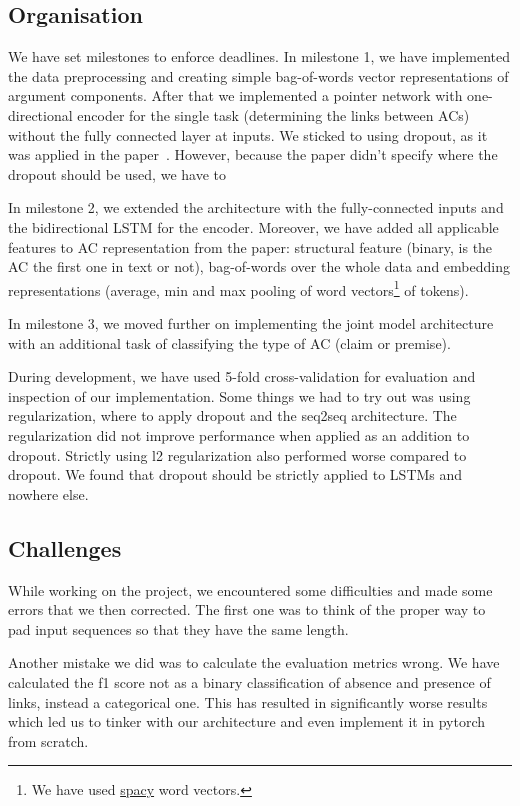 \documentclass[onecolumn]{article}
\begin{document}
\subsection{Organisation}
We have set milestones to enforce deadlines.
In milestone 1, we have implemented the data preprocessing and creating simple bag-of-words vector representations of argument components.
After that we implemented a pointer network with one-directional encoder for the single task (determining the links between ACs) without the fully connected layer at inputs.
We sticked to using dropout, as it was applied in the paper~\cite{potash2017here}.
However, because the paper didn't specify where the dropout should be used, we have to 

In milestone 2, we extended the architecture with the fully-connected inputs and the bidirectional LSTM for the encoder.
Moreover, we have added all applicable features to AC representation from the paper: structural feature
(binary, is the AC the first one in text or not), bag-of-words over the whole data and embedding representations (average, min and max pooling
of word vectors\footnote{We have used \href{https://github.com/explosion/spacy-models/releases/tag/en_vectors_web_lg-2.0.0}{spacy} word vectors.} of tokens).

In milestone 3, we moved further on implementing the joint model architecture with an additional task of classifying the type of AC (claim or premise).

During development, we have used 5-fold cross-validation for evaluation and inspection of our implementation.
Some things we had to try out was using regularization, where to apply dropout and the seq2seq architecture.
The regularization did not improve performance when applied as an addition to dropout.
Strictly using l2 regularization also performed worse compared to dropout.
We found that dropout should be strictly applied to LSTMs and nowhere else.

\subsection{Challenges}
While working on the project, we encountered some difficulties and made some errors that we then corrected. The first one
was to think of the proper way to pad input sequences so that they have the same length.

Another mistake we did was to calculate the evaluation metrics wrong.
We have calculated the f1 score not as a binary classification of absence and presence of links, instead a categorical one.
This has resulted in significantly worse results which led us to tinker with our architecture and even implement it in pytorch from scratch.
\end{document}
